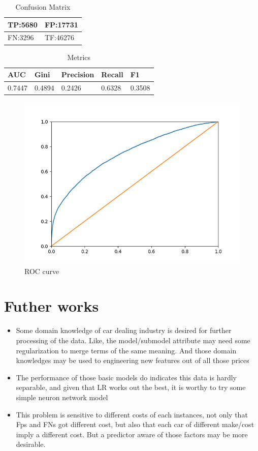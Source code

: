 \documentclass[a4paper]{article}
\begin{document}
\begin{table}[]
\centering
\caption{Confusion Matrix}
\label{confusion}
\begin{tabular}{|l|l|}
\hline
TP:5680 & FP:17731 \\ \hline
FN:3296 & TF:46276 \\ \hline
\end{tabular}
\end{table}

\begin{table}[]
\centering
\caption{Metrics}
\label{metrics}
\begin{tabular}{|l|l|l|l|l|}
\hline
AUC    & Gini   & Precision & Recall & F1     \\ \hline
0.7447 & 0.4894 & 0.2426    & 0.6328 & 0.3508 \\ \hline
\end{tabular}
\end{table}

\begin{figure}
\centering
\includegraphics[width=0.5\linewidth]{Figure_1.png}
\caption{ROC curve}
\label{roc}
\end{figure}

\section{Futher works}
\begin{itemize}
\item Some domain knowledge of car dealing industry is desired for further processing of the data. Like, the model/submodel attribute may need some regularization to merge terms of the same meaning. And those domain knowledges may be used to engineering new features out of all those prices
\item The performance of those basic models do indicates this data is hardly separable, and given that LR works out the best, it is worthy to try some simple neuron network model
\item This problem is sensitive to different costs of each instances, not only that Fps and FNs got different cost, but also that each car of different make/cost imply a different cost. But a predictor aware of those factors may be more desirable.
\end{itemize}
\end{document}
